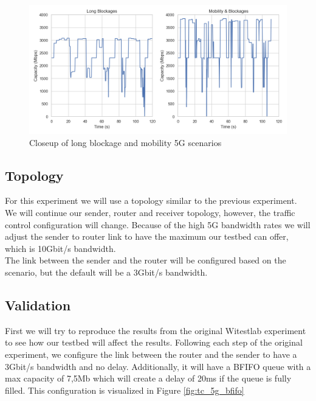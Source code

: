 \documentclass[a4paper,english, 11pt]{report}
\begin{document}
\begin{figure}[h!] %
	\centering
	\includegraphics[scale=0.33]{../diagrams/witestlab/lb_mobb.png}
  	\caption{Closeup of long blockage and mobility 5G scenarios}
  	\label{fig:witestlab_graph2}
\end{figure}

\subsection{Topology}
For this experiment we will use a topology similar to the previous experiment. We will continue our sender, router and receiver topology, however, the traffic control configuration will change. Because of the high 5G bandwidth rates we will adjust the sender to router link to have the maximum our testbed can offer, which is 10Gbit/s bandwidth.\\

The link between the sender and the router will be configured based on the scenario, but the default will be a 3Gbit/s bandwidth.

\subsection{Validation}

First we will try to reproduce the results from the original Witestlab experiment to see how our testbed will affect the results.
Following each step of the original experiment, we configure the link between the router and the sender to have a 3Gbit/s bandwidth and no delay. Additionally, it will have a BFIFO queue with a max capacity of 7,5Mb which will create a delay of 20ms if the queue is fully filled. This configuration is visualized in Figure \ref{fig:tc_5g_bfifo} \\
\end{document}
